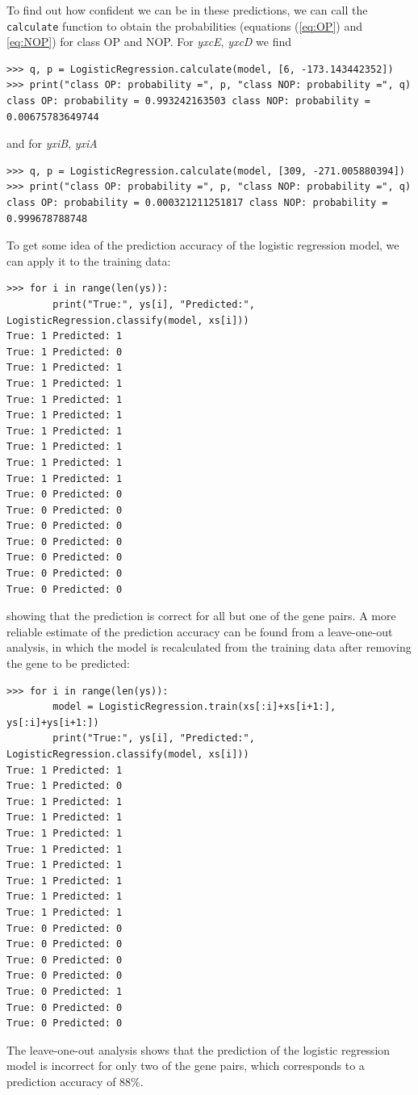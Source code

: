\documentclass{report}
\begin{document}
To find out how confident we can be in these predictions, we can call the \verb+calculate+ function to obtain the probabilities (equations (\ref{eq:OP}) and \ref{eq:NOP}) for class OP and NOP. For {\it yxcE}, {\it yxcD} we find
\begin{verbatim}
>>> q, p = LogisticRegression.calculate(model, [6, -173.143442352])
>>> print("class OP: probability =", p, "class NOP: probability =", q)
class OP: probability = 0.993242163503 class NOP: probability = 0.00675783649744
\end{verbatim}
and for {\it yxiB}, {\it yxiA}
\begin{verbatim}
>>> q, p = LogisticRegression.calculate(model, [309, -271.005880394])
>>> print("class OP: probability =", p, "class NOP: probability =", q)
class OP: probability = 0.000321211251817 class NOP: probability = 0.999678788748
\end{verbatim}

To get some idea of the prediction accuracy of the logistic regression model, we can apply it to the training data:
\begin{verbatim}
>>> for i in range(len(ys)):
        print("True:", ys[i], "Predicted:", LogisticRegression.classify(model, xs[i]))
True: 1 Predicted: 1
True: 1 Predicted: 0
True: 1 Predicted: 1
True: 1 Predicted: 1
True: 1 Predicted: 1
True: 1 Predicted: 1
True: 1 Predicted: 1
True: 1 Predicted: 1
True: 1 Predicted: 1
True: 1 Predicted: 1
True: 0 Predicted: 0
True: 0 Predicted: 0
True: 0 Predicted: 0
True: 0 Predicted: 0
True: 0 Predicted: 0
True: 0 Predicted: 0
True: 0 Predicted: 0
\end{verbatim}
showing that the prediction is correct for all but one of the gene pairs. A more reliable estimate of the prediction accuracy can be found from a leave-one-out analysis, in which the model is recalculated from the training data after removing the gene to be predicted:
\begin{verbatim}
>>> for i in range(len(ys)):
        model = LogisticRegression.train(xs[:i]+xs[i+1:], ys[:i]+ys[i+1:])
        print("True:", ys[i], "Predicted:", LogisticRegression.classify(model, xs[i]))
True: 1 Predicted: 1
True: 1 Predicted: 0
True: 1 Predicted: 1
True: 1 Predicted: 1
True: 1 Predicted: 1
True: 1 Predicted: 1
True: 1 Predicted: 1
True: 1 Predicted: 1
True: 1 Predicted: 1
True: 1 Predicted: 1
True: 0 Predicted: 0
True: 0 Predicted: 0
True: 0 Predicted: 0
True: 0 Predicted: 0
True: 0 Predicted: 1
True: 0 Predicted: 0
True: 0 Predicted: 0
\end{verbatim}
The leave-one-out analysis shows that the prediction of the logistic regression model is incorrect for only two of the gene pairs, which corresponds to a prediction accuracy of 88\%.
\end{document}
